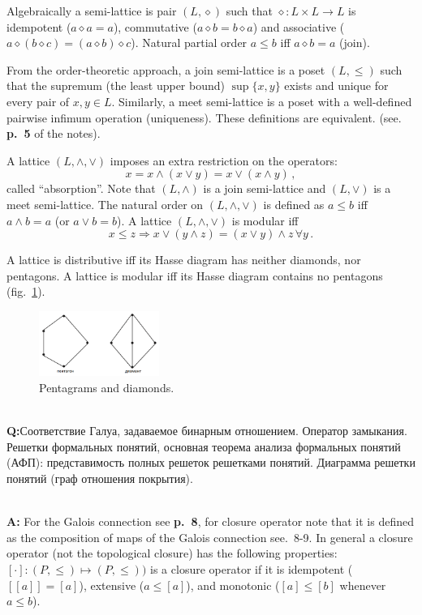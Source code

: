 \documentclass[a4paper]{article}
\newcommand{\rus}[1]{\foreignlanguage{russian}{#1}}
\begin{document}
Algebraically a semi-lattice is pair $(L, \diamond)$ such that $\diamond: L\times L \to L$
is idempotent ($a\diamond a=a$), commutative ($a \diamond b = b \diamond a$) and associative
($a \diamond (b \diamond c) = (a \diamond b) \diamond c$). Natural partial order $a\leq b$
iff $a\diamond b = a$ (join).

From the order-theoretic approach, a join semi-lattice is a poset $(L, \leq)$ such
that the supremum (the least upper bound) $\sup\{x, y\}$ exists and unique for every
pair of $x, y \in L$. Similarly, a meet semi-lattice is a poset with a well-defined
pairwise infimum operation (uniqueness). These definitions are equivalent. (see.
\textbf{p.~5} of the notes).

A lattice $(L, \wedge, \vee)$ imposes an extra restriction on the operators:
$$ x = x \wedge (x\vee y) = x \vee ( x\wedge y) \,, $$
called ``absorption''. Note that $(L, \wedge)$ is a join semi-lattice and $(L, \vee)$
is a meet semi-lattice. The natural order on $(L, \wedge, \vee)$ is defined as
$a\leq b$ iff $a\wedge b=a$ (or $a\vee b = b$). A lattice $(L, \wedge, \vee)$ is
modular iff
$$ x\leq z \Rightarrow x \vee (y\wedge z) = (x \vee y ) \wedge z\, \forall y\,. $$

A lattice is distributive iff its Hasse diagram has neither diamonds, nor pentagons.
A lattice is modular iff its Hasse diagram contains no pentagons (fig.~\ref{fig:lattice_pen_di}).
\begin{figure}
    \centering
    \includegraphics[width=0.35\textwidth]{pents_and_diamonds.png}
    \caption{Pentagrams and diamonds.}
    \label{fig:lattice_pen_di}
\end{figure}

\hfill\\\noindent\textbf{Q:}\rus{Соответствие Галуа, задаваемое бинарным отношением. Оператор
замыкания. Решетки формальных понятий, основная теорема анализа формальных понятий
(АФП): представимость полных решеток решетками понятий. Диаграмма решетки понятий
(граф отношения покрытия).}

\hfill\\\noindent\textbf{A:}
For the Galois connection see \textbf{p.~8}, for closure operator note that it is
defined as the composition of maps of the Galois connection see.~8-9. In general
a closure  operator (not the topological closure) has the following properties:
$[\cdot]: (P, \leq) \mapsto (P, \leq))$ is a closure operator if it is idempotent
($[[a]]=[a]$), extensive ($a\leq [a]$), and monotonic ($[a]\leq [b]$ whenever
$a\leq b$).
\end{document}

